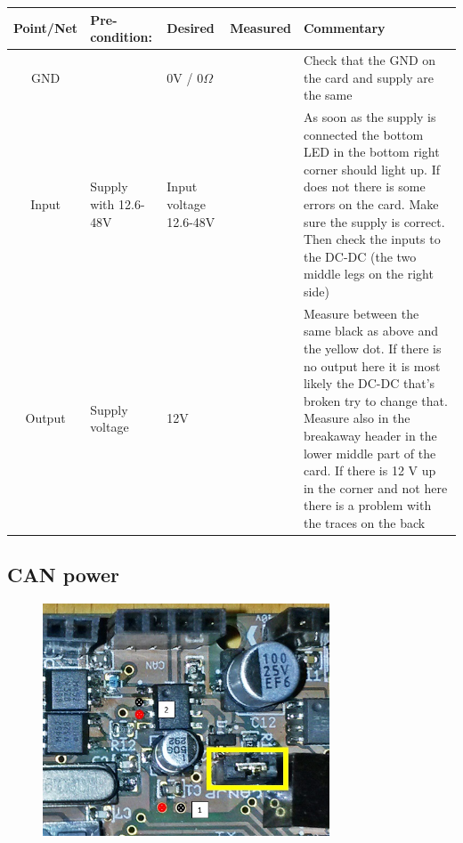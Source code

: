 \begin{table}[ht]
\begin{tabularx}{\textwidth}{|c|>{\hsize=0.6\hsize}X|>{\hsize=0.6\hsize}X|c|>{\hsize=1.8\hsize}X|} %
\hline 
Point/Net & Pre-condition: & Desired & Measured & Commentary \\ 
\hline 
GND &  & 0V / 0$\Omega$ &   & Check that the GND on the card and supply are the same  \\ 
\hline 
Input & Supply with 12.6-48V & Input voltage 12.6-48V  &    & As soon as the supply is connected the bottom LED in the bottom right corner should light up. If does not there is some errors on the card. Make sure the supply is correct. Then check the inputs to the DC-DC (the two middle legs on the right side) \\ 
\hline 
Output & Supply voltage & 12V &   & Measure between the same black as above and the yellow dot. If there is no output here it is most likely the DC-DC that’s broken try to change that.  Measure also in the breakaway header in the lower middle part of the card. If there is 12 V up in the corner and not here there is a problem with the traces on the back \\  
\hline
\end{tabularx}
\end{table}

\newpage
\subsection{CAN power}
\begin{figure}[!ht]
	\begin{center}
		\includegraphics[width=0.76\textwidth]{./Images/Unit-Test-CAN/CAN_power.jpg}
		\label{CAN_power}
	\end{center}
\end{figure}


